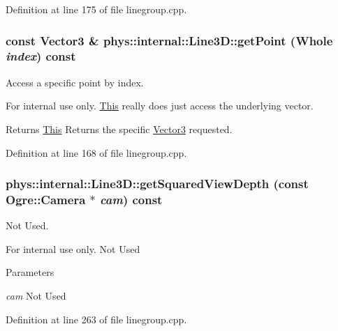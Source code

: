 Definition at line 175 of file linegroup.cpp.

\hypertarget{classphys_1_1internal_1_1Line3D_a190af0e38be28297ed2f6a7aecf0c316}{
\subsubsection[{getPoint}]{\setlength{\rightskip}{0pt plus 5cm}const {\bf Vector3} \& phys::internal::Line3D::getPoint ({\bf Whole} {\em index}) const}}
\label{d4/db5/classphys_1_1internal_1_1Line3D_a190af0e38be28297ed2f6a7aecf0c316}


Access a specific point by index. 

\begin{DoxyInternal}{For internal use only.}
\hyperlink{structThis}{This} really does just access the underlying vector. \begin{DoxyReturn}{Returns}
\hyperlink{structThis}{This} Returns the specific \hyperlink{classphys_1_1Vector3}{Vector3} requested. 
\end{DoxyReturn}
\end{DoxyInternal}


Definition at line 168 of file linegroup.cpp.

\hypertarget{classphys_1_1internal_1_1Line3D_a5d2622c10ef432e84cad59634dcee340}{
\subsubsection[{getSquaredViewDepth}]{ phys::internal::Line3D::getSquaredViewDepth (const Ogre::Camera $\ast$ {\em cam}) const}}
\label{d4/db5/classphys_1_1internal_1_1Line3D_a5d2622c10ef432e84cad59634dcee340}


Not Used. 

\begin{DoxyInternal}{For internal use only.}
Not Used 
\begin{DoxyParams}{Parameters}
\item[{\em cam}]Not Used \end{DoxyParams}
\end{DoxyInternal}


Definition at line 263 of file linegroup.cpp.

